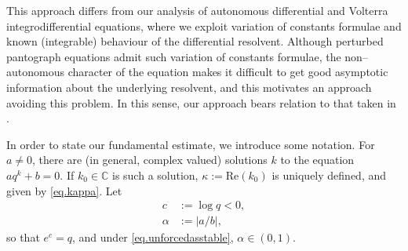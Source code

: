 \documentclass[a4paper,10pt,reqno]{amsart}
\numberwithin{equation}{section}
\theoremstyle{definition}
\theoremstyle{remark}
\DeclareMathOperator{\1}{\mathbbm 1}
\begin{document}
	This approach differs from our analysis of autonomous differential and Volterra integrodifferential equations, where we exploit variation of constants formulae and known (integrable) behaviour of the differential resolvent. Although perturbed pantograph equations admit such variation of constants formulae, the non--autonomous character of the equation makes it difficult to get good asymptotic information about the underlying resolvent, and this motivates an approach avoiding this problem. In this sense, our approach bears relation to that taken in \cite{AppBuck10}.      
	
	In order to state our fundamental estimate, we introduce some notation. For $a\neq 0$, there are (in general, complex valued) solutions $k$ to the equation $aq^k+b=0$. If $k_0\in \mathbb{C}$ is such a solution,  $\kappa:=\text{Re}(k_0)$ is uniquely defined, and given by \eqref{eq.kappa}.
	Let 
	\begin{align} \label{eq.c}
		c&:=\log q<0,\\
		\label{eq.alpha}
		\alpha&:=|a/b|,
	\end{align}
	so that $e^c=q$, and under \eqref{eq.unforcedasstable}, $\alpha\in (0,1)$. 
	
\end{document}
